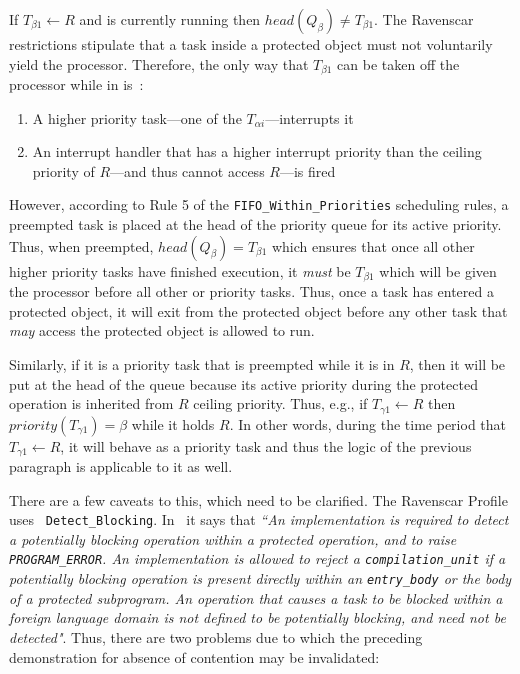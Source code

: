 If $T_{\beta 1} \gets R$ and is currently running then $head(Q_\beta)
\neq T_{\beta 1}$. The Ravenscar restrictions stipulate that a task
inside a protected object must not voluntarily yield the
processor. Therefore, the only way that $T_{\beta 1}$ can be taken off
the processor while in \si is:

\begin{enumerate}
\item{A higher priority task---one of the $T_{\alpha i}$---interrupts
  it}
\item{An interrupt handler that has a higher interrupt priority than
  the ceiling priority of $R$---and thus cannot access $R$---is fired}
\end{enumerate}

However, according to Rule 5 of the \texttt{FIFO\_Within\_Priorities}
scheduling rules, a preempted task is placed at the head of the
priority queue for its active priority. Thus, when preempted,
$head(Q_{\beta}) = T_{\beta 1}$ which ensures that once all other
higher priority tasks have finished execution, it \emph{must} be
$T_{\beta 1}$ which will be given the processor before all other \be
or \ga priority tasks. Thus, once a task has entered a protected
object, it will exit from the protected object before any other task
that \emph{may} access the protected object is allowed to run.

Similarly, if it is a \ga priority task that is preempted while it is
in $R$, then it will be put at the head of the \be queue because its
active priority during the protected operation is inherited from $R$
ceiling priority. Thus, e.g., if $T_{\gamma 1} \gets R$ then
$priority(T_{\gamma 1}) = \beta$ while it holds $R$. In other words,
during the time period that $T_{\gamma 1} \gets R$, it will behave as
a \be priority task and thus the logic of the previous paragraph is
applicable to it as well.

There are a few caveats to this, which need to be clarified. The
Ravenscar Profile uses \texttt{
  Detect\_Blocking}. In~\cite{arm95} it says that \emph{``An
  implementation is required to detect a potentially blocking
  operation within a protected operation, and to raise
  \emph{\texttt{PROGRAM\_ERROR}}. An implementation is allowed to
  reject a \emph{\texttt{compilation\_unit}} if a potentially blocking
  operation is present directly within an \emph{\texttt{entry\_body}}
  or the body of a protected subprogram. An operation that causes a
  task to be blocked within a foreign language domain is not defined
  to be potentially blocking, and need not be detected"}. Thus, there
are two problems due to which the preceding demonstration for absence
of contention may be invalidated:

